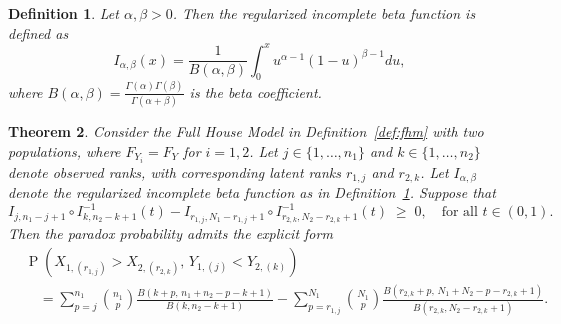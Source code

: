 \documentclass[12pt]{article}
\DeclareMathOperator*{\Prob}{P}
\newtheorem{theorem}{Theorem}[section]
\newtheorem{defn}[theorem]{Definition}
\begin{document}
\begin{defn}
\label{def:ribf}
Let $\alpha,\beta > 0$. Then the regularized incomplete beta function is defined as
$$
  I_{\alpha,\beta}(x) = \frac{1}{B(\alpha,\beta)} \int_0^x u^{\alpha-1}(1-u)^{\beta-1}du,
$$
where $B(\alpha,\beta) = \frac{\Gamma(\alpha)\Gamma(\beta)}{\Gamma(\alpha + \beta)}$ is the beta coefficient.
\end{defn}


\begin{theorem} \label{theorem:samedistgeneral}
Consider the Full House Model in Definition~\ref{def:fhm} with two populations, where $F_{Y_i} = F_Y$ for $i=1,2$. Let $j \in \{1,\dots,n_1\}$ and $k \in \{1,\dots,n_2\}$ denote observed ranks, with corresponding latent ranks $r_{1,j}$ and $r_{2,k}$. Let $I_{\alpha,\beta}$ denote the regularized incomplete beta function as in Definition~\ref{def:ribf}. Suppose that
\begin{equation} \label{eq:technical-condition}
I_{j, n_1-j+1} \circ I_{k, n_2-k+1}^{-1}(t)
-
I_{r_{1,j}, N_1 - r_{1,j}+1} \circ I_{r_{2,k}, N_2 - r_{2,k} + 1}^{-1}(t)
\;\geq\; 0,
\quad \text{for all } t \in (0,1).
\end{equation}
Then the paradox probability admits the explicit form
\begin{align*}
&\Prob\!\left(X_{1,(r_{1,j})} > X_{2,(r_{2,k})}, \, Y_{1,(j)} < Y_{2,(k)}\right) \\
&\quad= \sum_{p=j}^{n_1}\binom{n_1}{p}
\frac{B(k+p, \, n_1 + n_2 - p - k + 1)}{B(k, n_2-k+1)}
-
\sum_{p=r_{1,j}}^{N_1}\binom{N_1}{p}
\frac{B(r_{2,k}+p, \, N_1 + N_2 - p - r_{2,k} + 1)}{B(r_{2,k}, N_2-r_{2,k}+1)}.
\end{align*}
\end{theorem}
\end{document}
